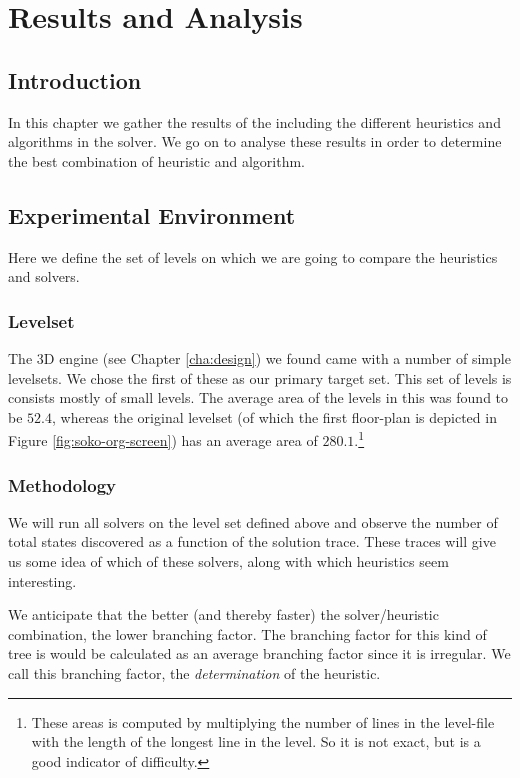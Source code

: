 \chapter{Results and Analysis}
\label{cha:analysis}

\section{Introduction}
In this chapter we gather the results of the including the different
heuristics and algorithms in the solver. We go on to analyse these
results in order to determine the best combination of heuristic and
algorithm.

\section{Experimental Environment}
Here we define the set of levels on which we are going to compare the
heuristics and solvers. 

\subsection{Levelset}
The 3D engine (see Chapter \ref{cha:design}) we found came with a
number of simple levelsets. We chose the first of these as our primary
target set. This set of levels is consists mostly of small levels. The
average area of the levels in this was found to be $52.4$, whereas the
original levelset (of which the first floor-plan is depicted in Figure
\ref{fig:soko-org-screen}) has an average area of
$280.1$.\footnote{These areas is computed by multiplying the number of
  lines in the level-file with the length of the longest line in the
  level. So it is not exact, but is a good indicator of difficulty.}


\subsection{Methodology}
We will run all solvers on the level set defined above and observe the
number of total states discovered as a function of the solution trace.
These traces will give us some idea of which of these solvers, along
with which heuristics seem interesting.

We anticipate that the better (and thereby faster) the
solver/heuristic combination, the lower branching factor. The
branching factor for this kind of tree is would be calculated as an
average branching factor since it is irregular. We call this branching
factor, the \emph{determination} of the heuristic.

